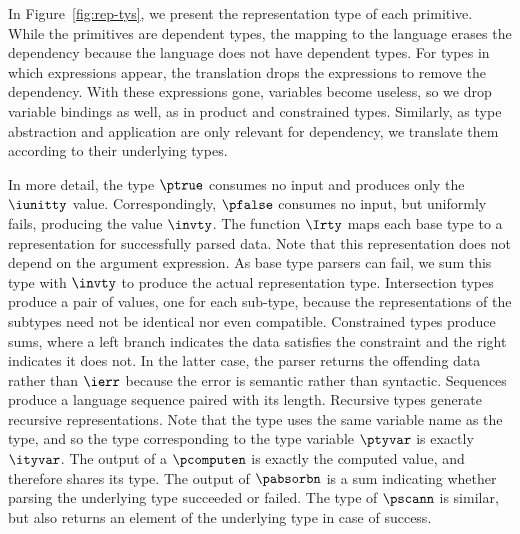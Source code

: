 In Figure~\ref{fig:rep-tys}, we present the representation type
of each \ddc{} primitive. While the primitives are
dependent types, the mapping to the \implang{} language erases the dependency because the \implang{} language does not have dependent types. For \ddc{} types in which expressions appear,
the translation drops the expressions to remove the dependency.
With these expressions gone, variables become useless, so we drop 
variable bindings as well, as in product and constrained types.
Similarly, as type abstraction and application are only relevant for
dependency, we translate them according to their underlying types.

In more detail,
the \ddc{} type $\ptrue$ consumes no input and produces only
the $\iunitty$ value.  Correspondingly, $\pfalse$ consumes no input,
but uniformly fails, producing the value $\invty$. The
function $\Irty$ maps each base type to a representation for
successfully parsed data. Note that this representation does not depend
on the argument expression. As base type parsers can fail, we sum this type
with $\invty$ to produce the actual representation type.
Intersection types produce a pair of values, one for each sub-type,
because the representations of the subtypes need not be identical nor
even compatible. 
Constrained types produce sums, where a left branch indicates the data
satisfies the constraint and the right indicates it does not. In
the latter case, the parser returns the offending data rather than
$\ierr$ because the error is semantic rather than syntactic.
Sequences produce a \implang{} language sequence paired with its
length.  Recursive types generate recursive representations. Note that the \implang{} type uses the same variable name
as the \ddc{} type, and so the type corresponding to the type variable
$\ptyvar$ is exactly $\ityvar$.
The output of a $\pcomputen$ is exactly the computed value, and
therefore shares its type.  The output of $\pabsorbn$ is a sum
indicating whether parsing the underlying type succeeded or failed.
The type of $\pscann$ is similar, but also returns an element of the
underlying type in case of success.

